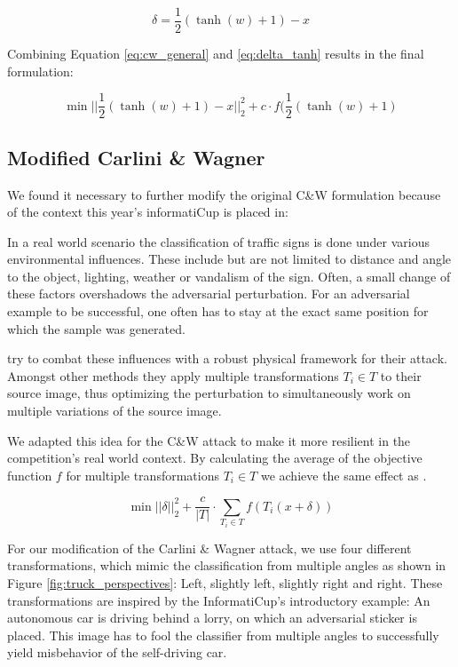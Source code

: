 \begin{equation}\label{eq:delta_tanh}
\delta = \frac{1}{2}(\tanh(w)+1) - x
\end{equation}

Combining Equation \ref{eq:cw_general} and \ref{eq:delta_tanh} results in the final formulation:

\begin{equation}\label{eq:cwl2_min_final}
\min ||\frac{1}{2}(\tanh(w)+1)-x||^2_2 + c \cdot f(\frac{1}{2}(\tanh(w)+1)
\end{equation}

\subsection{Modified Carlini \& Wagner}\label{subsec:cwl2_mod}

We found it necessary to further modify the original C\&W formulation because of the context this year's informatiCup is placed in:

In a real world scenario the classification of traffic signs is done under various environmental influences.
These include but are not limited to distance and angle to the object, lighting, weather or vandalism of the sign.
Often, a small change of these factors overshadows the adversarial perturbation. %
For an adversarial example to be successful, one often has to stay at the exact same position for which the sample was generated. 

\citet{eykholt2018robust} try to combat these influences with a robust physical framework for their attack.
Amongst other methods they apply multiple transformations $T_i \in T$ to their source image,
thus optimizing the perturbation to simultaneously work on multiple variations of the source image.

We adapted this idea for the C\&W attack to make it more resilient in the competition's real world context. By calculating the average of the objective function $f$ for multiple transformations $T_i \in T$ we achieve the same effect as \cite{eykholt2018robust}.

\begin{equation}
\min ||\delta||^2_2 + \frac{c}{|T|} \cdot \sum_{T_i \in T} f(T_i(x + \delta))
\end{equation}

For our modification of the Carlini \& Wagner attack, we use four different transformations,
which mimic the classification from multiple angles as shown in Figure \ref{fig:truck_perspectives}: Left, slightly left, slightly right and right.
These transformations are inspired by the InformatiCup's introductory example:
An autonomous car is driving behind a lorry, on which an adversarial sticker is placed.
This image has to fool the classifier from multiple angles to successfully yield misbehavior of the self-driving car.

